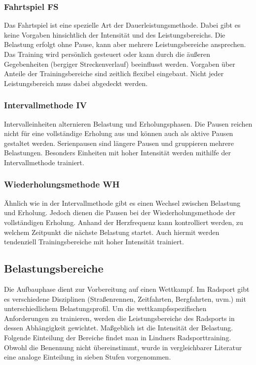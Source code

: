     \subsubsection{Fahrtspiel FS}
    Das Fahrtspiel ist eine spezielle Art der Dauerleistungsmethode. Dabei gibt es keine Vorgaben hinsichtlich der Intensität und des Leistungsbereichs. Die Belastung erfolgt ohne Pause, kann aber mehrere Leistungsbereiche ansprechen. Das Training wird persönlich gesteuert oder kann durch die äußeren Gegebenheiten (bergiger Streckenverlauf) beeinflusst werden. Vorgaben über Anteile der Trainingsbereiche sind zeitlich flexibel eingebaut. Nicht jeder Leistungsbereich muss dabei abgedeckt werden. 
    \subsubsection{Intervallmethode IV}
    Intervalleinheiten alternieren Belastung und Erholungsphasen. Die Pausen reichen nicht für eine vollständige Erholung aus und können auch als aktive Pausen gestaltet werden. Serienpausen sind längere Pausen und gruppieren mehrere Belastungen. Besonders Einheiten mit hoher Intensität werden mithilfe der Intervallmethode trainiert. 
    \subsubsection{Wiederholungsmethode WH}
    Ähnlich wie in der Intervallmethode gibt es einen Wechsel zwischen Belastung und Erholung. Jedoch dienen die Pausen bei der Wiederholungsmethode der vollständigen Erholung. Anhand der Herzfrequenz kann kontrolliert werden, zu welchem Zeitpunkt die nächste Belastung startet. Auch hiermit werden tendenziell Trainingsbereiche mit hoher Intensität trainiert.

\subsection{Belastungsbereiche}
Die Aufbauphase dient zur Vorbereitung auf einen Wettkampf. Im Radsport gibt es verschiedene Disziplinen (Straßenrennen, Zeitfahrten, Bergfahrten, uvm.) mit unterschiedlichem Belastungsprofil. Um die wettkampfsspezifischen Anforderungen zu trainieren, werden die Leistungsbereiche des Radsports in dessen Abhängigkeit gewichtet. Maßgeblich ist die Intensität der Belastung. Folgende Einteilung der Bereiche findet man in Lindners Radsporttraining. \cite[31-39]{Radsporttraining} Obwohl die Benennung nicht übereinstimmt, wurde in vergleichbarer Literatur \cite[27]{Ausdauertrainer} eine analoge Einteilung in sieben Stufen vorgenommen.
